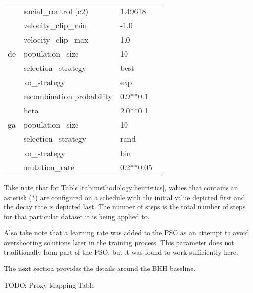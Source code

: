 \begin{table}[htbp]
{\begin{tabular}{llll}
                  & social\_control (c2) & 1.49618 &  \\
                  & velocity\_clip\_min & -1.0  &  \\
                  & velocity\_clip\_max & 1.0   &  \\
            de    & population\_size & 10    & \cite{ref:mezura:2006} \\
                  & selection\_strategy & best  &  \\
                  & xo\_strategy & exp   &  \\
                  & recombination probability & 0.9**0.1 &  \\
                  & beta  & 2.0**0.1 &  \\
            ga    & population\_size & 10    & \cite{ref:lambora:2019} \\
                  & selection\_strategy & rand  &  \\
                  & xo\_strategy & bin   &  \\
                  & mutation\_rate & 0.2**0.05 &  \\
        \end{tabular}%
    }
\end{table}%

Take note that for Table \ref{tab:methodology:heuristics}, values that contains an asterisk ($*$) are configured on a schedule with the initial value depicted first and the decay rate is depicted last. The number of steps is the total number of steps for that particular dataset it is being applied to.

Also take note that a learning rate was added to the \ac{PSO} as an attempt to avoid overshooting solutions later in the training process. This parameter does not traditionally form part of the \ac{PSO}, but it was found to work sufficiently here.

The next section provides the details around the \ac{BHH} baseline.



















TODO: Proxy Mapping Table



























